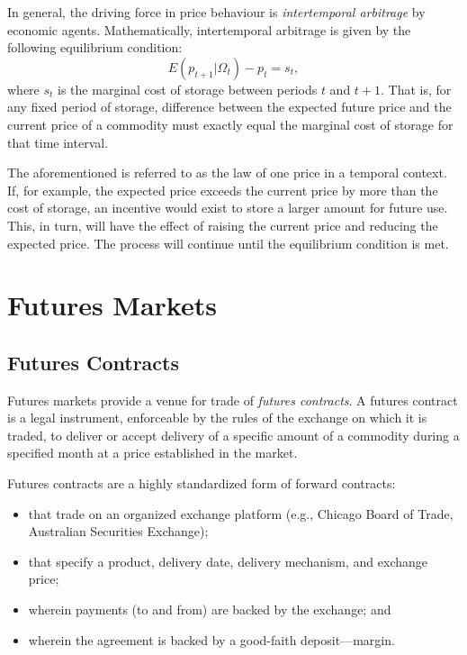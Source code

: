 \documentclass[
]{book}
\providecommand{\tightlist}{%
  \setlength{\itemsep}{0pt}\setlength{\parskip}{0pt}}
\begin{document}
In general, the driving force in price behaviour is \emph{intertemporal arbitrage} by economic agents. Mathematically, intertemporal arbitrage is given by the following equilibrium condition: \[E\left(p_{t+1}|\Omega_t\right)-p_{t} = s_t,\] where \(s_t\) is the marginal cost of storage between periods \(t\) and \(t+1\). That is, for any fixed period of storage, difference between the expected future price and the current price of a commodity must exactly equal the marginal cost of storage for that time interval.

The aforementioned is referred to as the law of one price in a temporal context. If, for example, the expected price exceeds the current price by more than the cost of storage, an incentive would exist to store a larger amount for future use. This, in turn, will have the effect of raising the current price and reducing the expected price. The process will continue until the equilibrium condition is met.

\hypertarget{futures-markets}{%
\chapter{Futures Markets}\label{futures-markets}}

\hypertarget{futures-contracts}{%
\section{Futures Contracts}\label{futures-contracts}}

Futures markets provide a venue for trade of \emph{futures contracts}. A futures contract is a legal instrument, enforceable by the rules of the exchange on which it is traded, to deliver or accept delivery of a specific amount of a commodity during a specified month at a price established in the market.

Futures contracts are a highly standardized form of forward contracts:

\begin{itemize}
\tightlist
\item
  that trade on an organized exchange platform (e.g., Chicago Board of Trade, Australian Securities Exchange);
\item
  that specify a product, delivery date, delivery mechanism, and exchange price;
\item
  wherein payments (to and from) are backed by the exchange; and
\item
  wherein the agreement is backed by a good-faith deposit---margin.
\end{itemize}
\end{document}
